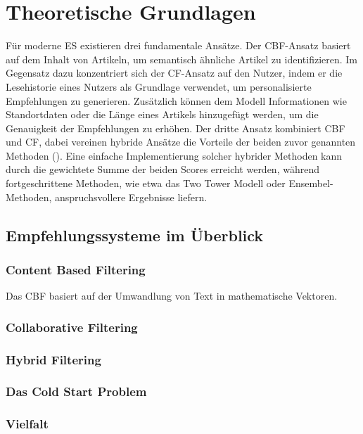 \section{Theoretische Grundlagen}
Für moderne \ac{ES} existieren drei fundamentale Ansätze. 
Der \ac{CBF}-Ansatz basiert auf dem Inhalt von Artikeln, um semantisch ähnliche Artikel zu 
identifizieren. Im Gegensatz dazu konzentriert sich der \ac{CF}-Ansatz auf den Nutzer, 
indem er die Lesehistorie eines Nutzers als Grundlage verwendet, 
um personalisierte Empfehlungen zu generieren. Zusätzlich können dem Modell Informationen wie 
Standortdaten oder die Länge eines Artikels hinzugefügt werden, um die Genauigkeit der 
Empfehlungen zu erhöhen. Der dritte Ansatz kombiniert \ac{CBF} und \ac{CF}, 
dabei vereinen hybride Ansätze die Vorteile der beiden zuvor genannten Methoden (\cite{raza_news_2020}).
Eine einfache Implementierung solcher hybrider Methoden kann 
durch die gewichtete Summe der beiden Scores erreicht werden, während fortgeschrittene Methoden, 
wie etwa das Two Tower Modell oder Ensembel-Methoden, anspruchsvollere Ergebnisse liefern.

\subsection{Empfehlungssysteme im Überblick}
\subsubsection{Content Based Filtering}
Das CBF basiert auf der Umwandlung von Text in mathematische Vektoren.
\subsubsection{Collaborative Filtering}

\subsubsection{Hybrid Filtering}

\subsubsection{Das Cold Start Problem}

\subsubsection{Vielfalt}

